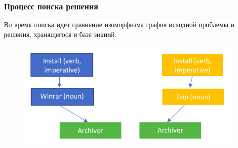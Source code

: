 \documentclass[14pt]{beamer}
\begin{document}



\begin{frame}
\frametitle{Процесс поиска решения}
Во время поиска идет сравнение изоморфизма графов исходной проблемы и решения, хранящегося в базе знаний.
\begin{figure} [h] 
  \center
  \includegraphics [scale=0.5] {SolutionSearch1}
  \label{img:SolutionSearch1}  
\end{figure}
\end{frame}
\end{document}
